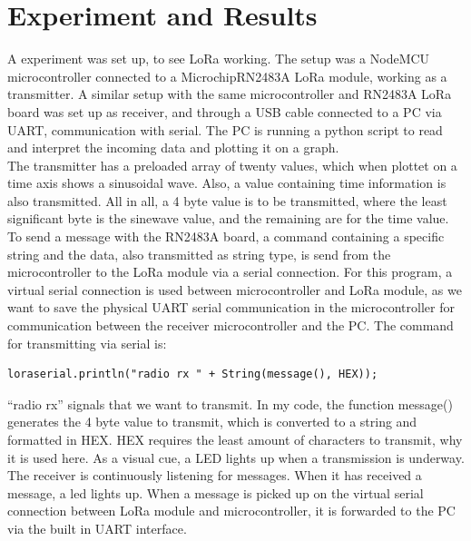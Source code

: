 \section{Experiment and Results}
A experiment was set up, to see LoRa working. The setup was a NodeMCU microcontroller connected to a Microchip\textregistered  RN2483A LoRa module, working as a transmitter. A similar setup with the same microcontroller and RN2483A LoRa board was set up as receiver, and through a USB cable connected to a PC via UART, communication with serial. The PC is running a python script to read and interpret the incoming data and plotting it on a graph.\\

The transmitter has a preloaded array of twenty values, which when plottet on a time axis shows a sinusoidal wave. Also, a value containing time information is also transmitted. All in all, a 4 byte value is to be transmitted, where the least significant byte is the sinewave value, and the remaining are for the time value. To send a message with the RN2483A board, a command containing a specific string and the data, also transmitted as string type, is send from the microcontroller to the LoRa module via a serial connection. For this program, a virtual serial connection is used between microcontroller and LoRa module, as we want to save the physical UART serial communication in the microcontroller for communication between the receiver microcontroller and the PC. The command for transmitting via serial is:

\begin{lstlisting}
loraserial.println("radio rx " + String(message(), HEX));
\end{lstlisting}

``radio rx'' signals that we want to transmit. In my code, the function message() generates the 4 byte value to transmit, which is converted to a string and formatted in HEX. HEX requires the least amount of characters to transmit, why it is used here. As a visual cue, a LED lights up when a transmission is underway.\\

The receiver is continuously listening for messages. When it has received a message, a led lights up. When a message is picked up on the virtual serial connection between LoRa module and microcontroller, it is forwarded to the PC via the built in UART interface.\\

